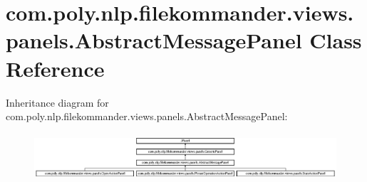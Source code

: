 \hypertarget{classcom_1_1poly_1_1nlp_1_1filekommander_1_1views_1_1panels_1_1_abstract_message_panel}{\section{com.\-poly.\-nlp.\-filekommander.\-views.\-panels.\-Abstract\-Message\-Panel Class Reference}
\label{classcom_1_1poly_1_1nlp_1_1filekommander_1_1views_1_1panels_1_1_abstract_message_panel}
}
Inheritance diagram for com.\-poly.\-nlp.\-filekommander.\-views.\-panels.\-Abstract\-Message\-Panel\-:\begin{figure}[H]
\begin{center}
\leavevmode
\includegraphics[height=1.769352cm]{classcom_1_1poly_1_1nlp_1_1filekommander_1_1views_1_1panels_1_1_abstract_message_panel}
\end{center}
\end{figure}
